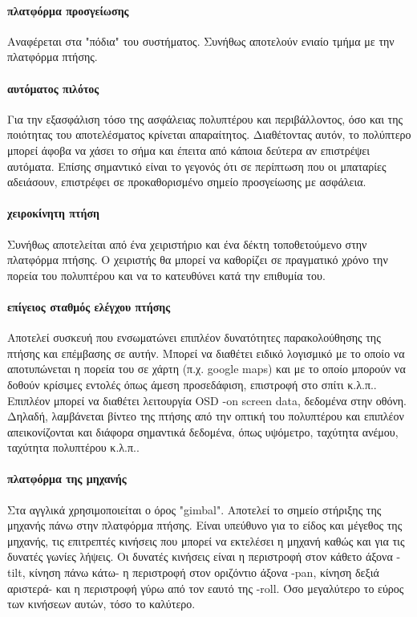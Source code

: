 \documentclass[a4paper, 12pt, twoside]{report}
\begin{document}
{{{{{{			\paragraph{πλατφόρμα προσγείωσης}{Αναφέρεται στα "πόδια" του συστήματος. Συνήθως αποτελούν ενιαίο τμήμα με την πλατφόρμα πτήσης.
			}
			\paragraph{αυτόματος πιλότος}{Για την εξασφάλιση τόσο της ασφάλειας πολυπτέρου και περιβάλλοντος, όσο και της ποιότητας του αποτελέσματος κρίνεται απαραίτητος. Διαθέτοντας αυτόν, το πολύπτερο μπορεί άφοβα να χάσει το σήμα και έπειτα από κάποια δεύτερα αν επιστρέψει αυτόματα. Επίσης σημαντικό είναι το γεγονός ότι σε περίπτωση που οι μπαταρίες αδειάσουν, επιστρέφει σε προκαθορισμένο σημείο προσγείωσης με ασφάλεια.
			}
			\paragraph{χειροκίνητη πτήση}{Συνήθως αποτελείται από ένα χειριστήριο και ένα δέκτη τοποθετούμενο στην πλατφόρμα πτήσης. Ο χειριστής θα μπορεί να καθορίζει σε πραγματικό χρόνο την πορεία του πολυπτέρου και να το κατευθύνει κατά την επιθυμία του.
			}
			\paragraph{επίγειος σταθμός ελέγχου πτήσης}{Αποτελεί συσκευή που ενσωματώνει επιπλέον δυνατότητες παρακολούθησης της πτήσης και επέμβασης σε αυτήν. Μπορεί να διαθέτει ειδικό λογισμικό με το οποίο να αποτυπώνεται η πορεία του σε χάρτη (π.χ. google maps) και με το οποίο μπορούν να δοθούν κρίσιμες εντολές όπως άμεση προσεδάφιση, επιστροφή στο σπίτι κ.λ.π.. Επιπλέον μπορεί να διαθέτει λειτουργία OSD -on screen data, δεδομένα στην οθόνη. Δηλαδή, λαμβάνεται βίντεο της πτήσης από την οπτική του πολυπτέρου και επιπλέον απεικονίζονται και διάφορα σημαντικά δεδομένα, όπως υψόμετρο, ταχύτητα ανέμου, ταχύτητα πολυπτέρου κ.λ.π..
			}
			\paragraph{πλατφόρμα της μηχανής}{Στα αγγλικά χρησιμοποιείται ο όρος "gimbal". Αποτελεί το σημείο στήριξης της μηχανής πάνω στην πλατφόρμα πτήσης. Είναι υπεύθυνο για το είδος και μέγεθος της μηχανής, τις επιτρεπτές κινήσεις που μπορεί να εκτελέσει η μηχανή καθώς και για τις δυνατές γωνίες λήψεις. Οι δυνατές κινήσεις είναι η περιστροφή στον κάθετο άξονα -tilt, κίνηση πάνω κάτω- η περιστροφή στον οριζόντιο άξονα -pan, κίνηση δεξιά αριστερά- και η περιστροφή γύρω από τον εαυτό της -roll. Όσο μεγαλύτερο το εύρος των κινήσεων αυτών, τόσο το καλύτερο.
			}
}}}}}}
\end{document}
